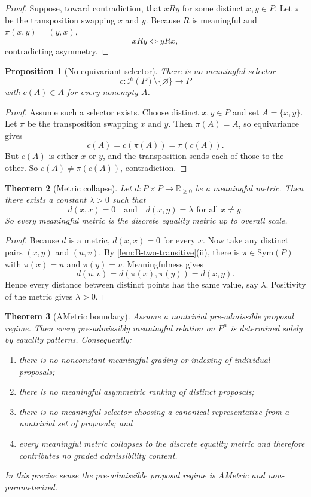 \documentclass[11pt]{article}
\theoremstyle{plain}
\newtheorem{theorem}{Theorem}[section]
\newtheorem{proposition}[theorem]{Proposition}
\theoremstyle{definition}
\begin{document}
\begin{proof}
Suppose, toward contradiction, that $xRy$ for some distinct $x,y\in P$. Let $\pi$ be the transposition swapping $x$ and $y$. Because $R$ is meaningful and $\pi(x,y)=(y,x)$,
\[
xRy \Longleftrightarrow yRx,
\]
contradicting asymmetry.
\end{proof}

\begin{proposition}[No equivariant selector]
\label{prop:B-no-selector}
There is no meaningful selector
\[
c:\mathcal P(P)\setminus\{\varnothing\}\to P
\]
with $c(A)\in A$ for every nonempty $A$.
\end{proposition}

\begin{proof}
Assume such a selector exists. Choose distinct $x,y\in P$ and set $A=\{x,y\}$. Let $\pi$ be the transposition swapping $x$ and $y$. Then $\pi(A)=A$, so equivariance gives
\[
c(A)=c(\pi(A))=\pi(c(A)).
\]
But $c(A)$ is either $x$ or $y$, and the transposition sends each of those to the other. So $c(A)\neq \pi(c(A))$, contradiction.
\end{proof}

\begin{theorem}[Metric collapse]
\label{thm:B-metric-collapse}
Let $d:P\times P\to \mathbb R_{\ge 0}$ be a meaningful metric. Then there exists a constant $\lambda>0$ such that
\[
d(x,x)=0 \quad\text{and}\quad d(x,y)=\lambda \text{ for all } x\neq y.
\]
So every meaningful metric is the discrete equality metric up to overall scale.
\end{theorem}

\begin{proof}
Because $d$ is a metric, $d(x,x)=0$ for every $x$. Now take any distinct pairs $(x,y)$ and $(u,v)$. By \cref{lem:B-two-transitive}(ii), there is $\pi\in\mathrm{Sym}(P)$ with $\pi(x)=u$ and $\pi(y)=v$. Meaningfulness gives
\[
d(u,v)=d(\pi(x),\pi(y))=d(x,y).
\]
Hence every distance between distinct points has the same value, say $\lambda$. Positivity of the metric gives $\lambda>0$.
\end{proof}

\begin{theorem}[AMetric boundary]
\label{thm:B-ametric}
Assume a nontrivial pre-admissible proposal regime. Then every pre-admissibly meaningful relation on $P^n$ is determined solely by equality patterns. Consequently:
\begin{enumerate}[label=(A\arabic*), leftmargin=2.8em]
    \item there is no nonconstant meaningful grading or indexing of individual proposals;
    \item there is no meaningful asymmetric ranking of distinct proposals;
    \item there is no meaningful selector choosing a canonical representative from a nontrivial set of proposals; and
    \item every meaningful metric collapses to the discrete equality metric and therefore contributes no graded admissibility content.
\end{enumerate}
In this precise sense the pre-admissible proposal regime is \emph{AMetric} and non-parameterized.
\end{theorem}
\end{document}
